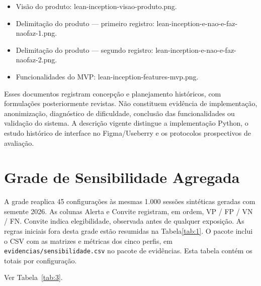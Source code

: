 \begin{apendicesenv}
\begin{itemize}
\item
  Visão do produto: lean-inception-visao-produto.png.
\item
  Delimitação do produto --- primeiro registro: lean-inception-e-nao-e-faz-naofaz-1.png.
\item
  Delimitação do produto --- segundo registro: lean-inception-e-nao-e-faz-naofaz-2.png.
\item
  Funcionalidades do MVP: lean-inception-features-mvp.png.
\end{itemize}

Esses documentos registram concepção e planejamento históricos, com formulações posteriormente revistas. Não constituem evidência de implementação, anonimização, diagnóstico de dificuldade, conclusão das funcionalidades ou validação do sistema. A descrição vigente distingue a implementação Python, o estudo histórico de interface no Figma/\allowbreak{}Useberry e os protocolos prospectivos de avaliação.

\chapter{Grade de Sensibilidade Agregada}
\label{ap:M}

A grade reaplica 45 configurações às mesmas 1.000 sessões sintéticas geradas com semente 2026. As colunas Alerta e Convite registram, em ordem, VP / FP / VN / FN. Convite indica elegibilidade, observada antes de qualquer exposição. As regras iniciais fora desta grade estão resumidas na Tabela\nobreakspace{}\ref{tab:1}. O pacote inclui o CSV com as matrizes e métricas dos cinco perfis, em \texttt{evidencias/\allowbreak{}sensibilidad\allowbreak{}e.\allowbreak{}csv} no pacote de evidências. Esta tabela contém os totais por configuração.

\noindent Ver Tabela~\ref{tab:3}.


\end{apendicesenv}
